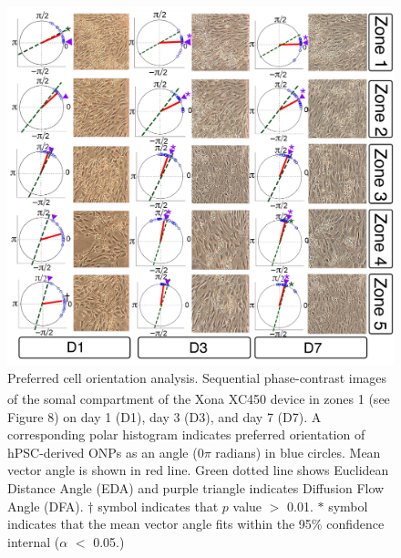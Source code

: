 \documentclass[review]{elsarticle}
\begin{document}
\begin{figure}
	\begin{center}
		\includegraphics[width=13cm]{Fig_9.jpg}
	\end{center}
	\caption{Preferred cell orientation analysis. Sequential phase-contrast images of the somal compartment of the Xona\textsuperscript{\texttrademark} XC450 device in zones 1 (see Figure 8) on day 1 (D1), day 3 (D3), and day 7 (D7). A corresponding polar histogram indicates preferred orientation of hPSC-derived ONPs as an angle (0$\pi$ radians) in blue circles. Mean vector angle is shown in red line. Green dotted line shows Euclidean Distance Angle (EDA) and purple triangle indicates Diffusion Flow Angle (DFA). $\dagger$ symbol indicates that $p$ value $>$ 0.01. $\ast$ symbol indicates that the mean vector angle fits within the 95\% confidence internal ($\alpha$ $<$ 0.05.)}
\end{figure}
\end{document}
